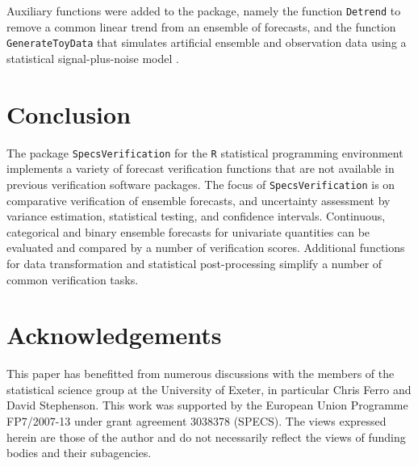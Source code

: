\documentclass[10pt]{article}\usepackage[]{graphicx}\usepackage[]{color}
\newcommand{\proglang}[1]{\texttt{#1}}
\newcommand{\pkg}[1]{\texttt{#1}}
\newcommand{\code}[1]{\texttt{#1}}
\begin{document}
Auxiliary functions were added to the package, namely the function \code{Detrend} to remove a common linear trend from an ensemble of forecasts, and the function \code{GenerateToyData} that simulates artificial ensemble and observation data using a statistical signal-plus-noise model \citep{siegert2016bayesian}.




\section{Conclusion}

The package \pkg{SpecsVerification} for the \proglang{R} statistical programming environment implements a variety of forecast verification functions that are not available in previous verification software packages.
The focus of \pkg{SpecsVerification} is on comparative verification of ensemble forecasts, and uncertainty assessment by variance estimation, statistical testing, and confidence intervals.
Continuous, categorical and binary ensemble forecasts for univariate quantities can be evaluated and compared by a number of verification scores.
Additional functions for data transformation and statistical post-processing simplify a number of common verification tasks.


\section*{Acknowledgements}

This paper has benefitted from numerous discussions with the members of the statistical science group at the University of Exeter, in particular Chris Ferro and David Stephenson.
This work was supported by the European Union Programme FP7/2007-13 under grant agreement 3038378 (SPECS).
The views expressed herein are those of the author and do not necessarily reflect the views of funding bodies and their subagencies.



\end{document}
